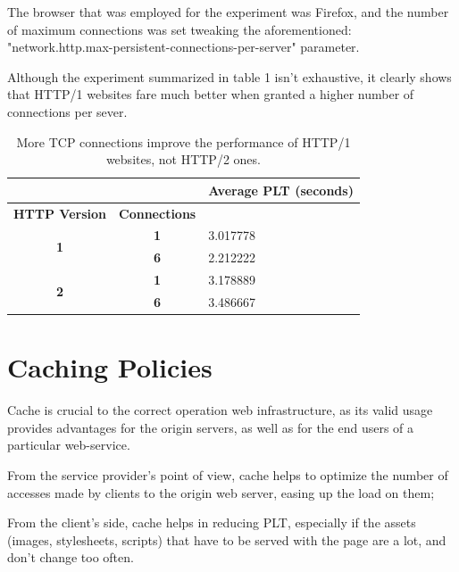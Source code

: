 \documentclass[a4paper,10pt]{article}
\begin{document}
The browser that was employed for the experiment was Firefox, and the number of maximum connections was set tweaking the aforementioned: "network.http.max-persistent-connections-per-server" parameter.

Although the experiment summarized in table 1 isn't exhaustive, it clearly shows that HTTP/1 websites fare much better when granted a higher number of connections per sever. 

\clearpage

\begin{table}[h!]
\centering
\begin{tabular}{|c|c|l|}
\hline
\multicolumn{1}{|r|}{\textbf{}} & \multicolumn{1}{l|}{} & \textbf{Average PLT (seconds)}         \\ \hline
\textbf{HTTP Version}          & \textbf{Connections}  & \multicolumn{1}{c|}{\textbf{}} \\ \hline
\multirow{2}{*}{\textbf{1}}     & \textbf{1}            & 3.017778                       \\ \cline{2-3} 
                                & \textbf{6}            & 2.212222                       \\ \hline
\multirow{2}{*}{\textbf{2}}     & \textbf{1}            & 3.178889                       \\ \cline{2-3} 
                                & \textbf{6}            & 3.486667                       \\ \hline
\end{tabular}
\caption{More TCP connections improve the performance of HTTP/1 websites, not HTTP/2 ones.}
\label{fig:table1}

\end{table}



\section{Caching Policies}

Cache is crucial to the correct operation web infrastructure, as its valid usage provides advantages for the origin servers, as well as for the end users of a particular web-service. 

From the service provider's point of view, cache helps to optimize the number of accesses made by clients to the origin web server, easing up the load on them; 

From the client's side, cache helps in reducing PLT, especially if the assets (images, stylesheets, scripts) that have to be served with the page are a lot, and don't change too often.
\end{document}
